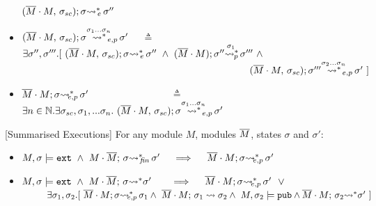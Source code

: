 \begin{definition}
\begin{itemize}
$\leadstoBoundedThreeStarExt {\Mtwo\cdot M} {\sigma\bd}  {\sigma}  {\sigma''}$
\item
$\WithExtPub {\Mtwo\cdot M} {\sigma\bd}  {\sigma}  {\sigma'} {\sigma_1...\sigma_n}$   \ \  $\triangleq$ \ \ 
$\exists \sigma'',\sigma'''.[\   {\leadstoBoundedThreeStarExt {\Mtwo\cdot M} {\sigma\bd}  {\sigma}  {\sigma''}}\ \wedge\ 
{\WithPub {\Mtwo\cdot M}    {\sigma''}  {\sigma'''} {\sigma_1}} \ \wedge$\\   
$\strut \hspace{8.2cm} {\WithExtPub {\Mtwo\cdot M} {\sigma\bd}  {\sigma'''}  {\sigma'} {\sigma_2...\sigma_n} }  \ ]$
\item
$\leadstoBoundedExtPub {\Mtwo\cdot M}    {\sigma}  {\sigma'} $   \ \ \ \ \   \ \ \  \ \ \ \   \ \ \ \  $\triangleq$   \ \ 
  $ \exists n\in \mathbb{N}. \exists \sigma\bd, \sigma_1,...\sigma_n. \ \WithExtPub {\Mtwo\cdot M} {\sigma\bd}  {\sigma}  {\sigma'} {\sigma_1...\sigma_n} 
$
\end{itemize}
\end{definition}

 
 \begin{auxLemma}
\label{lemma:external_breakdown:term}[Summarised Executions]
For any module $M$, modules $\Mtwo$, states $\sigma$ and $\sigma'$:
\\
\begin{itemize}
\item
$M,\sigma \models \extThis\ \wedge \ \leadstoBoundedStarFin {M\cdot \Mtwo}  {\sigma}  {\sigma'}  \ \ \  \ 
\Longrightarrow \ \ \  \ \leadstoBoundedExtPub {\Mtwo\cdot M}    {\sigma}  {\sigma'}$
\item
$M,\sigma \models \extThis\ \wedge \ \leadstoBoundedStar  {M\cdot \Mtwo}  {\sigma}  {\sigma'}  \ \ \  \ \ \  
\Longrightarrow \ \ \  \  \leadstoBoundedExtPub {\Mtwo\cdot M}    {\sigma}  {\sigma'}\ \ \vee$\\
$\strut \ \ \ \ \ \ \ \    \exists \sigma_1,\sigma_2.[\ 
\leadstoBoundedExtPub {\Mtwo\cdot M}    {\sigma}  {\sigma_1} 
\wedge\ \leadstoBounded  {\Mtwo\cdot M}    {\sigma_1}  {\sigma_2} 
\wedge \ M, \sigma_2 \models \pubMeth \wedge \leadstoBoundedStar  {\Mtwo\cdot M}    {\sigma_2}  {\sigma'} \ ]
$
\end{itemize}
\end{auxLemma}


